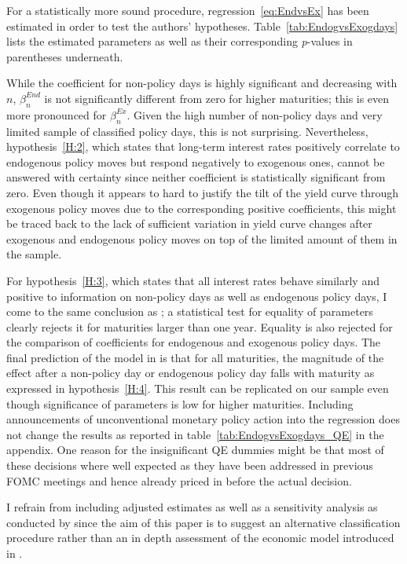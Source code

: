 For a statistically more sound procedure, regression~\eqref{eq:EndvsEx} has been estimated in order to test the authors' hypotheses. Table~\vref{tab:EndogvsExogdays} lists the estimated parameters as well as their corresponding \textit{p}-values in parentheses underneath.

%
While the coefficient for non-policy days is highly significant and decreasing with $n$, $\beta_n^{End}$ is not significantly different from zero for higher maturities; this is even more pronounced for $\beta_n^{Ex}$. Given the high number of non-policy days and very limited sample of classified policy days, this is not surprising. Nevertheless, hypothesis~\ref{H:2}, which states that long-term interest rates positively correlate to endogenous policy moves but respond negatively to exogenous ones, cannot be answered with certainty since neither coefficient is statistically significant from zero. Even though it appears to hard to justify the tilt of the yield curve through exogenous policy moves due to the corresponding positive coefficients, this might be traced back to the lack of sufficient variation in yield curve changes after exogenous and endogenous policy moves on top of the limited amount of them in the sample. 

For hypothesis~\ref{H:3}, which states that all interest rates behave similarly and positive to information on non-policy days as well as endogenous policy days, I come to the same conclusion as \textcite{Ellingsen.2003}; a statistical test for equality of parameters clearly rejects it for maturities larger than one year. Equality is also rejected for the comparison of coefficients for endogenous and exogenous policy days. The final prediction of the model in \textcite{Ellingsen.2001} is that for all maturities, the magnitude of the effect after a non-policy day or endogenous policy day falls with maturity as expressed in hypothesis~\ref{H:4}. This result can be replicated on our sample even though significance of parameters is low for higher maturities. 
Including announcements of unconventional monetary policy action into the regression does not change the results as reported in table~\vref{tab:EndogvsExogdays_QE} in the appendix. One reason for the insignificant QE dummies might be that most of these decisions where well expected as they have been addressed in previous FOMC meetings and hence already priced in before the actual decision. 

I refrain from including adjusted estimates as well as a sensitivity analysis as conducted by \textcite{Ellingsen.2003} since the aim of this paper is to suggest an alternative classification procedure rather than an in depth assessment of the economic model introduced in \textcite{Ellingsen.2001}.


